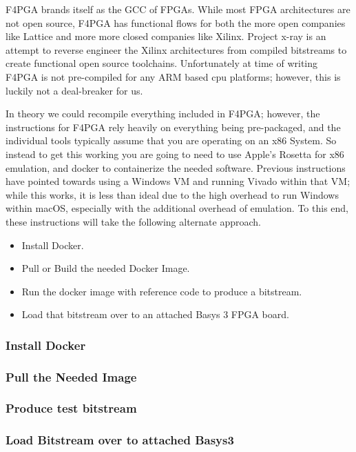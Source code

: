 F4PGA brands itself as the GCC of FPGAs. 
While most FPGA architectures are not open source, F4PGA has functional flows for both the more open companies like Lattice 
and more more closed companies like Xilinx.
Project x-ray is an attempt to reverse engineer the Xilinx architectures from compiled bitstreams to create functional open source toolchains.
Unfortunately at time of writing F4PGA is not pre-compiled for any ARM based cpu platforms; 
however, this is luckily not a deal-breaker for us.


In theory we could recompile everything included in F4PGA; however, 
the instructions for F4PGA rely heavily on everything being pre-packaged, 
and the individual tools typically assume that you are operating on an x86 System. 
So instead to get this working you are going to need to use Apple's Rosetta for x86 emulation, 
and docker to containerize the needed software. 
Previous instructions have pointed towards using a Windows VM and running Vivado within that VM; 
while this works, it is less than ideal due to the high overhead to run Windows within macOS, 
especially with the additional overhead of emulation. 
To this end, these instructions will take the following alternate approach.

\begin{itemize}
    \item Install Docker. 
    \item Pull or Build the needed Docker Image.
    \item Run the docker image with reference code to produce a bitstream.
    \item Load that bitstream over to an attached Basys 3 FPGA board.
\end{itemize}

\subsubsection{Install Docker}


\subsubsection{Pull the Needed Image}


\subsubsection{Produce test bitstream}


\subsubsection{Load Bitstream over to attached Basys3}

